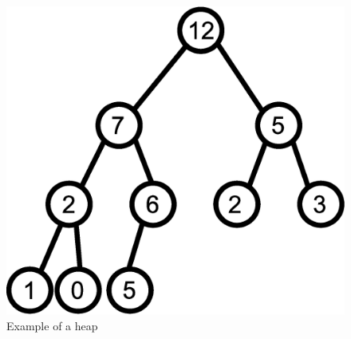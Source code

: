 \documentclass[11pt,a4paper]{article}
\begin{document}
\begin{figure}[h!]
\centering
\includegraphics[scale=0.5]{inkscape/tree1.eps}
\caption{Example of a heap}
\label{tree1}
\end{figure}
\end{document}
